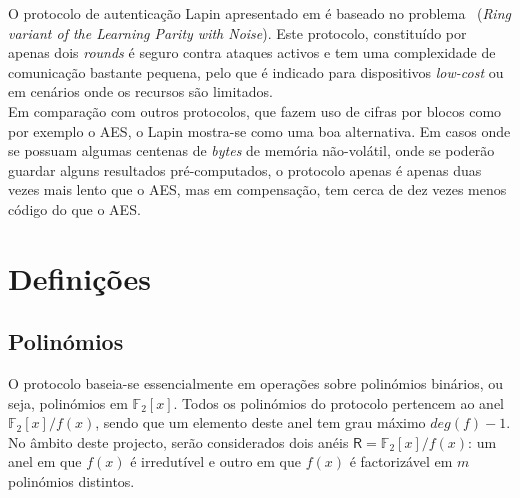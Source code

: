 O protocolo de autenticação Lapin apresentado em \cite{lapin} é baseado no problema \RingLPN\ (\textit{Ring variant of the Learning Parity with Noise}). Este protocolo, constituído por apenas dois \textit{rounds} é seguro contra ataques activos e tem uma complexidade de comunicação bastante pequena, pelo que é indicado para dispositivos \textit{low-cost} ou em cenários onde os recursos são limitados.\\
Em comparação com outros protocolos, que fazem uso de cifras por blocos como por exemplo o AES, o Lapin mostra-se como uma boa alternativa. Em casos onde se possuam algumas centenas de \textit{bytes} de memória não-volátil, onde se poderão guardar alguns resultados pré-computados, o protocolo apenas é apenas duas vezes mais lento que o AES, mas em compensação, tem cerca de dez vezes menos código do que o AES.\\
\section{Definições}
\subsection{Polinómios}
O protocolo baseia-se essencialmente em operações sobre polinómios binários, ou seja, polinómios em $\mathbb{F}_2[x]$. Todos os polinómios do protocolo pertencem ao anel $\mathbb{F}_2[x]/f(x)$, sendo que um elemento deste anel tem grau máximo $deg(f)-1$. No âmbito deste projecto, serão considerados dois anéis $\mathsf{R} = \mathbb{F}_2[x]/f(x)$: um anel em que $f(x)$ é irredutível e outro em que $f(x)$ é factorizável em $m$ polinómios distintos.
